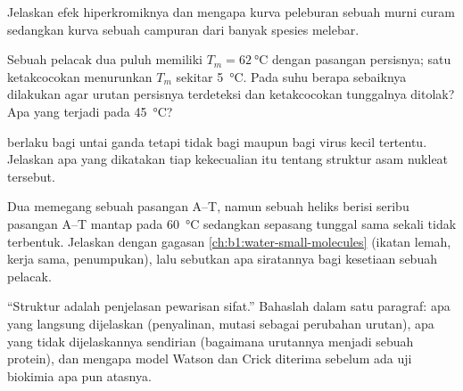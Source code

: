 \begin{exercise}[$\star\star$]\label{exo:b1:nucleic-acids:8}
Jelaskan efek hiperkromiknya dan mengapa kurva peleburan sebuah 
murni curam sedangkan kurva sebuah campuran  dari banyak spesies
melebar.
\end{exercise}

\begin{exercise}[$\star\star$]\label{exo:b1:nucleic-acids:9}
Sebuah pelacak dua puluh  memiliki $T_m = \qty{62}{\celsius}$
dengan pasangan persisnya; satu ketakcocokan menurunkan $T_m$ sekitar
\qty{5}{\celsius}. Pada suhu berapa  sebaiknya dilakukan
agar urutan persisnya terdeteksi dan ketakcocokan tunggalnya ditolak?
Apa yang terjadi pada
\qty{45}{\celsius}?
\end{exercise}

\begin{exercise}[$\star\star\star$]\label{exo:b1:nucleic-acids:10}
 berlaku bagi  untai ganda tetapi tidak bagi 
maupun bagi  virus kecil tertentu. Jelaskan apa yang dikatakan tiap
kekecualian itu tentang struktur asam nukleat tersebut.
\end{exercise}

\begin{exercise}[$\star\star\star$]\label{exo:b1:nucleic-acids:11}
Dua  memegang sebuah pasangan A--T, namun sebuah heliks
berisi seribu pasangan A--T mantap pada \qty{60}{\celsius} sedangkan
sepasang tunggal sama sekali tidak terbentuk. Jelaskan dengan gagasan
\cref{ch:b1:water-small-molecules} (ikatan lemah, kerja sama,
penumpukan), lalu sebutkan apa siratannya bagi kesetiaan sebuah
pelacak.
\end{exercise}

\begin{exercise}[$\star\star\star$]\label{exo:b1:nucleic-acids:12}
``Struktur  adalah penjelasan pewarisan sifat.'' Bahaslah dalam satu
paragraf: apa yang langsung dijelaskan  (penyalinan, mutasi
sebagai perubahan urutan), apa yang tidak dijelaskannya sendirian
(bagaimana urutannya menjadi sebuah protein), dan mengapa model Watson
dan Crick diterima sebelum ada uji biokimia apa pun atasnya.
\end{exercise}

